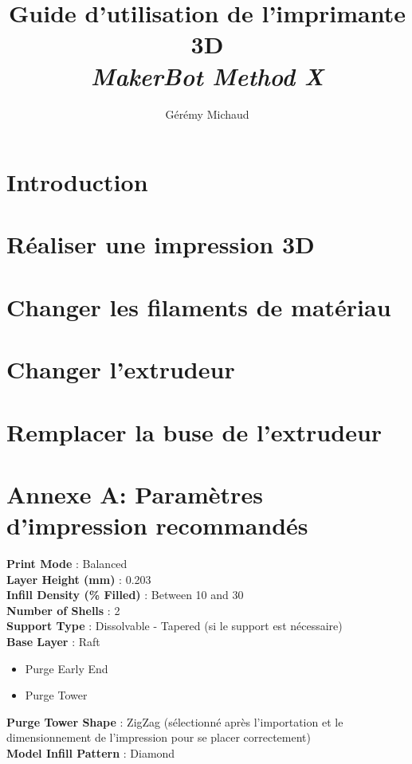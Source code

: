 \documentclass{Thesis}
\title{Guide d'utilisation de l'imprimante 3D
\\\Large{\textit{MakerBot Method X}}}
\author{Gérémy Michaud}{G. Michaud}
\begin{document}
\newpage
\tableofcontents
\clearpage
\section{Introduction}

\section{Réaliser une impression 3D}

\section{Changer les filaments de matériau}

\section{Changer l'extrudeur}

\section{Remplacer la buse de l'extrudeur}

\newpage
\appendix
\section{Annexe A: Paramètres d'impression recommandés}
\label{annexe1}
\textbf{Print Mode} : Balanced \\
\textbf{Layer Height (mm)} : 0.203 \\
\textbf{Infill Density (\% Filled)} : Between 10 and 30 \\
\textbf{Number of Shells} : 2 \\
\textbf{Support Type} : Dissolvable - Tapered (si le support est nécessaire)\\
\textbf{Base Layer} : Raft
\newcommand{\cmark}{\ding{51}}
\newcommand{\done}{\rlap{$\square$}{\raisebox{2pt}{\large\hspace{1pt}\cmark}}}
\begin{itemize}
    \setlength\itemsep{1mm}
    \item[\done] Purge Early End
    \item[\done] Purge Tower
\end{itemize}
\textbf{Purge Tower Shape} : ZigZag (sélectionné après l'importation et le dimensionnement de l'impression pour se placer correctement) \\
\textbf{Model Infill Pattern} : Diamond
\end{document}
